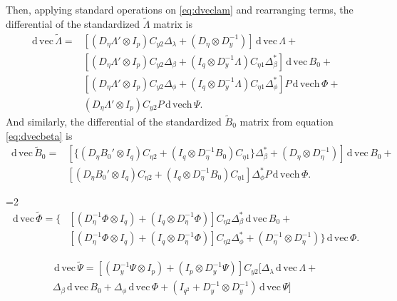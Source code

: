 \documentclass[a4paper,11pt]{article}
\newcommand{\n}{\eta}
\renewcommand{\l}{\lambda}
\renewcommand{\b}{\beta}
\newcommand{\p}{\phi}
\renewcommand{\d}{\,\mathrm{d}\,}
\newcommand{\kronprod}{\otimes}
\renewcommand{\vec}{\mathrm{vec}\,}
\newcommand{\vech}{\mathrm{vech}\,}
\newcommand{\Lambdastan}{\tilde{\Lambda}}
\newcommand{\Bstan}{\tilde{B}}
\newcommand{\Phistan}{\tilde{\Phi}}
\newcommand{\Psistan}{\tilde{\Psi}}
\newcommand{\0}{\boldsymbol{0}}
\begin{document}
Then, applying standard operations on \ref{eq:dveclam} and rearranging terms,
the differential of the standardized $\Lambdastan$ matrix is
\begin{equation}\label{eq:dveclam_final}
\begin{split}
  \d\vec\Lambdastan = 
     & [(D_\n \Lambda' \kronprod I_p) C_{y2} \Delta_\l + 
        (D_\n \kronprod D_y^{-1})] 
        \d\vec\Lambda +\\
     & [(D_\n \Lambda' \kronprod I_p) C_{y2} \Delta_\b + 
        (I_q \kronprod D_y^{-1}\Lambda) C_{\n1} \Delta^*_\b ] 
        \d\vec B_0 +\\
     & [(D_\n \Lambda' \kronprod I_p) C_{y2} \Delta_\p + 
        (I_q \kronprod D_y^{-1}\Lambda) C_{\n1} \Delta^*_\p ] 
       P \d\vech \Phi +\\
     & (D_\n \Lambda' \kronprod I_p) C_{y2} 
       P \d\vech \Psi.
\end{split}\end{equation}
And similarly, the differential of the standardized $\Bstan_0$ matrix from
equation \ref{eq:dvecbeta} is
\begin{equation}\label{eq:dvecbeta_final}
\begin{split}
  \d\vec \Bstan_0 =
     & [\{(D_\n B_0' \kronprod I_q) C_{\n2}  + 
        (I_q \kronprod D_\n^{-1}B_0) C_{\n1} \} \Delta^*_\b +
           (D_\n \kronprod D_\n^{-1})  ] 
        \d\vec B_0 +\\
     & [(D_\n B_0' \kronprod I_q) C_{\n2}  + 
        (I_q \kronprod D_\n^{-1}B_0) C_{\n1} ] \Delta^*_\p 
       P \d\vech \Phi.
\end{split}\end{equation}

=2
\begin{equation}\label{eq:dvecphi_final}
\begin{split}
  \d\vec \Phistan = \{
     & [  (D^{-1}_\n \Phi \kronprod I_q)  + (I_q \kronprod D_\n^{-1}\Phi)  ] C_{\n2} \Delta^*_\b        \d\vec B_0 +\\
     & [(D^{-1}_\n \Phi \kronprod I_q)  + (I_q \kronprod D_\n^{-1}\Phi)  ]  C_{\n2} \Delta^*_\p   +    (D_\n^{-1} \kronprod D_\n^{-1})
     \}   \d\vec \Phi.
\end{split}\end{equation}

\begin{equation}\label{eq:dvecpsi_final}
\begin{split}
  \d\vec \Psistan = 
   [(D^{-1}_y \Psi \kronprod I_p)  + (I_p \kronprod D_y^{-1}\Psi)  ]  C_{y2} 
   [
   \Delta_\l \d\vec\Lambda +\\
   \Delta_\b         \d\vec B_0 +
   \Delta_\p         \d\vec \Phi +
   (I_{q^2}  + D^{-1}_y \kronprod D^{-1}_y) \d\vec \Psi
   ]
\end{split}\end{equation}
\fi
\end{document}
